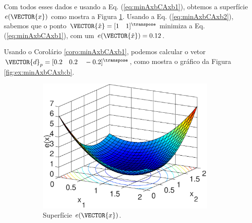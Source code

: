 \begin{SolutionT}
\label{ex:minAxbCAxb:sol1}
Com todos esses dados e usando a Eq. (\ref{eq:minAxbCAxb1}),
obtemos a superfície $e(\VECTOR{x})$ como mostra a Figura \ref{fig:ex:minAxbCAxb:a}.
Usando a Eq. (\ref{eq:minAxbCAxb2}), sabemos que o ponto $\VECTOR{\hat{x}}=[1\quad 1]^{\transpose}$
minimiza a Eq. (\ref{eq:minAxbCAxb1}), com um $e(\VECTOR{\hat{x}})=0.12$.

Usando o Corolário \ref{coro:minAxbCAxb1}, podemos calcular o vetor $\VECTOR{d}_p=[0.2 \quad 0.2 \quad -0.2]^{\transpose}$,
como mostra o gráfico da Figura \ref{fig:ex:minAxbCAxb:b}.

\begin{figure}[h!]
     \centering
     \begin{subfigure}[b]{0.66\textwidth}
         \centering
         \includegraphics[width=0.98\textwidth]{chapters/minimization-fx/mfiles/ax1/surfcex.eps}
         \caption{Superfície $e(\VECTOR{x})$. }
         \label{fig:ex:minAxbCAxb:a}
     \end{subfigure}
     \hfill
     \begin{subfigure}[b]{0.32\textwidth}
         \centering

\end{subfigure}
\end{figure}
\end{SolutionT}
